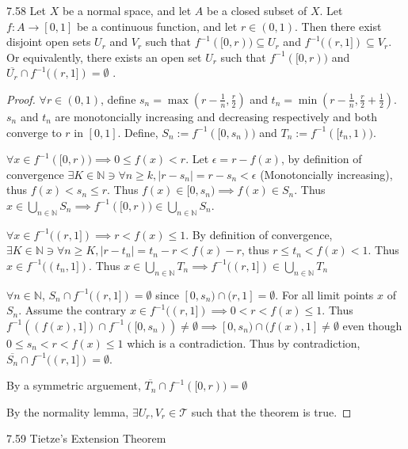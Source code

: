 \documentclass{article}
\newcommand*{\T}{\mathcal{T}}
\newcommand*{\subeq}{\subseteq}
\newcommand*{\empset}{\emptyset}
\newcommand{\Q}{\mathbb{Q}}
\newcommand{\N}{\mathbb{N}}
\newcommand{\abs}[1]{\left\lvert #1\right\rvert}
\begin{document}
\bigskip
\begin{claim}{7.58}\label{Claim 7.58.}
    Let $X$ be a normal space, and let $A$ be a closed subset of $X$. Let $f: A \to [0, 1]$ be a continuous function, and let $r \in (0, 1)$. Then there exist disjoint open sets $U_r$ and $V_r$ such that $f^{-1}([0, r)) \subeq U_r$  and $ f^{-1}((r, 1]) \subeq V_r$. Or equivalently, there exists an open set $U_r$ such that $f^{-1}([0, r))$  and $\overline{U_r} \cap f^{-1}((r, 1]) = \empset$ .
\end{claim}
\begin{proof}
    $\forall r \in (0, 1)$, define $s_n = \max(r - \frac{1}{n}, \frac{r}{2})$ and $t_n = \min(r - \frac{1}{n}, \frac{r}{2} + \frac{1}{2})$. $s_n$ and $t_n$ are monotoncially increasing and decreasing respectively and both converge to $r$ in $[0, 1]$. Define, $S_n := f^{-1}([0, s_n))$ and $T_n := f^{-1}([t_n, 1))$. 
    
    $\forall x \in f^{-1}([0, r)) \implies 0 \leq f(x) < r$. Let $\epsilon = r - f(x)$, by definition of convergence $\exists K \in \N \ni \forall n \geq k , \abs{r - s_n} = r - s_n < \epsilon$ (Monotoncially increasing), thus $f(x) < s_n \leq r$. Thus $f(x) \in [0, s_n) \implies f(x) \in S_n$. Thus $x \in \bigcup_{n \in \N} S_n \implies f^{-1}([0, r)) \in \bigcup_{n \in \N} S_n$. 
    
    $\forall x \in f^{-1}((r, 1]) \implies r < f(x) \leq 1$. By definition of convergence, $\exists K \in \N \ni \forall n \geq K, \abs{r - t_n} = t_n - r < f(x) - r$, thus $r \leq t_n < f(x) < 1$. Thus $x \in f^{-1}((t_n, 1])$. Thus $x \in \bigcup_{n \in \N}T_n \implies f^{-1}((r, 1]) \in \bigcup_{n \in \N}T_n$ 
    
    $\forall n \in \N$, $S_n \cap f^{-1}((r, 1]) = \empset$ since $[0, s_n) \cap (r, 1] = \empset$. For all limit points $x$ of $S_n$. Assume the contrary $x \in f^{-1}((r, 1]) \implies 0 < r < f(x) \leq 1$. Thus $f^{-1}((f(x), 1]) \cap f^{-1}([0, s_n)) \neq \empset \implies [0, s_n) \cap (f(x), 1] \neq \empset$ even though $0 \leq s_n < r < f(x) \leq 1$ which is a contradiction. Thus by contradiction, $\overline{S_n} \cap f^{-1}((r, 1]) =  \empset$. 
    
    By a symmetric arguement, $\overline{T_n} \cap f^{-1}([0, r)) =  \empset$
    
    By the normality lemma, $\exists U_r, V_r \in \T$ such that the theorem is true. 
\end{proof}

\bigskip

\begin{claim}{7.59}\label{Claim 7.59.}
    Tietze's Extension Theorem
\end{claim}
    
\end{document}
